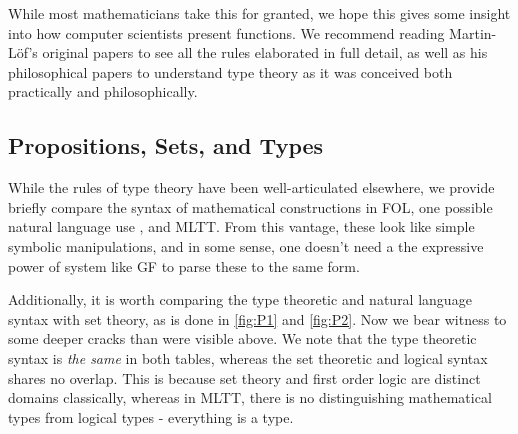 While most mathematicians take this for granted, we hope this gives some insight
into how computer scientists present functions. We recommend reading
Martin-Löf's original papers \cite{ml1984} \cite{ml79} to see all the rules
elaborated in full detail, as well as his philosophical papers
\cite{mlMeanings} \cite{mlTruth} to understand type theory as it was conceived
both practically and philosophically.

\subsection{Propositions, Sets, and Types}

While the rules of type theory have been well-articulated elsewhere, we provide
briefly compare the syntax of mathematical constructions in FOL, one possible
natural language use \cite{rantaLog}, and MLTT. From this vantage, these look
like simple symbolic manipulations, and in some sense, one doesn't need a the
expressive power of system like GF to parse these to the same form.

Additionally, it is worth comparing the type theoretic and natural language
syntax with set theory, as is done in \autoref{fig:P1} and \autoref{fig:P2}. Now
we bear witness to some deeper cracks than were visible above. We note that the
type theoretic syntax is \emph{the same} in both tables, whereas the set
theoretic and logical syntax shares no overlap. This is because set theory and
first order logic are distinct domains classically, whereas in MLTT,
there is no distinguishing mathematical types from logical types - everything is
a type.

